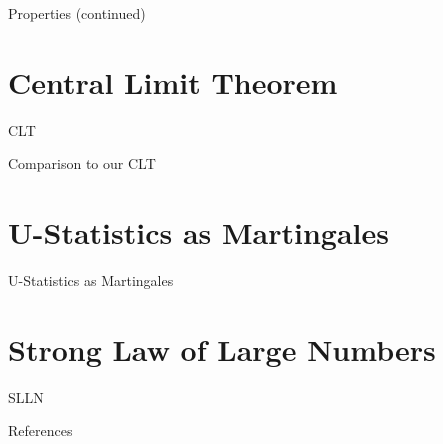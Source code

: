 \documentclass{beamer}
\begin{document}
\begin{frame}{Properties (continued)}

\end{frame}


\section{Central Limit Theorem}
\begin{frame}{CLT}
\end{frame}
\begin{frame}{Comparison to our CLT}
\end{frame}
\section{U-Statistics as Martingales}
\begin{frame}{U-Statistics as Martingales}
\end{frame}
\section{Strong Law of Large Numbers}
\begin{frame}{SLLN}
\end{frame}
\begin{frame}{References}
\printbibliography
\end{frame}
\end{document}
